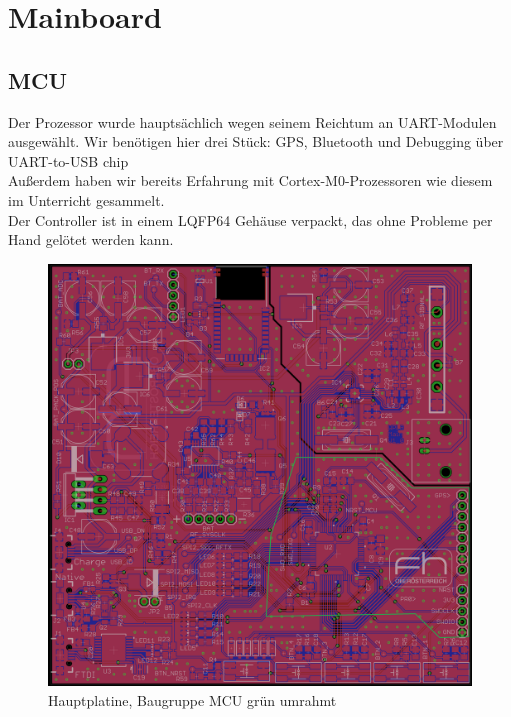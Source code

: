 \documentclass[a4paper]{scrartcl}
\begin{document}
\ofoot{\pagemark}

\tableofcontents
\newpage

\section{Mainboard}
\subsection{MCU}

Der Prozessor wurde hauptsächlich wegen seinem Reichtum an UART-Modulen ausgewählt. Wir benötigen hier drei Stück: GPS, Bluetooth und Debugging über UART-to-USB chip\\Außerdem haben wir bereits Erfahrung mit Cortex-M0-Prozessoren wie diesem im Unterricht gesammelt.\\Der Controller ist in einem LQFP64 Gehäuse verpackt, das ohne Probleme per Hand gelötet werden kann.

\begin{figure}[H]\centering
\includegraphics[page=1, angle=0, width=\linewidth]{../Documentation/pics/mainboard_mcu.png}
\caption{Hauptplatine, Baugruppe MCU grün umrahmt}
\end{figure}
\end{document}
